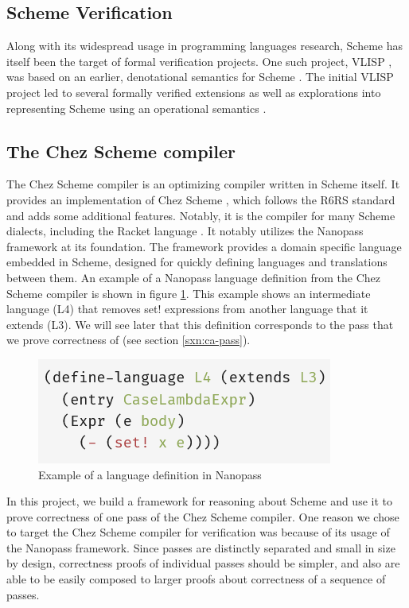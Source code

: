 \subsection{Scheme Verification}
Along with its widespread usage in programming languages research, Scheme has itself been the target of formal verification projects. One such project, VLISP \cite{guttman_vlisp_1995}, was based on an earlier, denotational semantics for Scheme \cite{IEEE_scheme}. The initial VLISP project led to several formally verified extensions as well as explorations into representing Scheme using an operational semantics \cite{guttman_vlisp_system_1995}.

\subsection{The Chez Scheme compiler}
The Chez Scheme compiler is an optimizing compiler written in Scheme itself. It provides an implementation of Chez Scheme \cite{dybvig1983chez}, which follows the R6RS standard and adds some additional features. Notably, it is the compiler for many Scheme dialects, including the Racket language \cite{felleisen2015racket}. It notably utilizes the Nanopass framework \cite{keep2013nanopass} at its foundation. The framework provides a domain specific language embedded in Scheme, designed for quickly defining languages and translations between them. An example of a Nanopass language definition from the Chez Scheme compiler is shown in figure \ref{fig:nanopass_ex}. This example shows an intermediate language (L4) that removes set! expressions from another language that it extends (L3). We will see later that this definition corresponds to the pass that we prove correctness of (see section \ref{sxn:ca-pass}).

\begin{figure}
    \centering
    \includegraphics[scale=0.75, keepaspectratio]{figures/np_def.png}
    \caption{Example of a language definition in Nanopass}
    \label{fig:nanopass_ex}
\end{figure}

In this project, we build a framework for reasoning about Scheme and use it to prove correctness of one pass of the Chez Scheme compiler. One reason we chose to target the Chez Scheme compiler for verification was because of its usage of the Nanopass framework. Since passes are distinctly separated and small in size by design, correctness proofs of individual passes should be simpler, and also are able to be easily composed to larger proofs about correctness of a sequence of passes.
